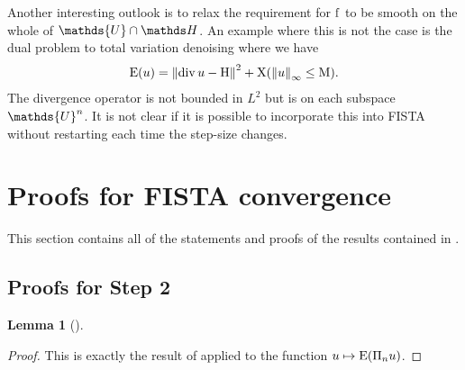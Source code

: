\documentclass[10pt,a4paper,onecolumn]{article} \usepackage[latin1]{inputenc}
\numberwithin{equation}{section}
\newtheorem{lemma}{Lemma}[section]\newtheorem{example}{Example}[section]
\let\F\mathds\let\C\mathcal\newcommand{\R}{\F{R}}\newcommand{\A}{\C{A}}
\newcommand{\norm}[1]{{\left\lVert #1 \right\rVert}}
\newcommand{\op}[1]{\operatorname{#1}}\newcommand{\overtext}[2]{\stackrel{\text{#1}}{#2}}
\newcommand*{\Func}[1]{%
	\IfEqCase{#1}{%
		{0}{\op{E}}%
		{1}{\op{F}}%
		{2}{\op{G}}%
		{3}{\op{H}}%
	}[\op{F}#1]%
}
\newcommand*{\func}[1]{%
	\IfEqCase{#1}{%
		{0}{\op{e}}%
		{1}{\op{f}}%
		{2}{\op{g}}%
		{3}{\op{h}}%
	}[\op{f}#1]%
}
\newcommand*{\varf}[1]{%
	\IfEqCase{#1}{%
		{0}{u}%
		{1}{v}%
		{2}{w}%
	}[u#1]%
}
\newcommand*{\spcf}[1]{%
	\IfEqCase{#1}{%
		{0}{\F{U}}%
		{1}{\F{V}}%
		{2}{\F{W}}%
	}[\F{U}#1]%
}
\begin{document}
Another interesting outlook is to relax the requirement for $\func1$ to be smooth on the whole of $\spcf0\cap\F H$. An example where this is not the case is the dual problem to total variation denoising where we have
$$ \Func0(\varf0) = \norm{\op{div}\varf0-\vdata0}^2 + \chi(\norm{\varf0}_\infty\leq \mu).$$
The divergence operator is not bounded in $L^2$ but is on each subspace $\spcf0^n$. It is not clear if it is possible to incorporate this into FISTA without restarting each time the step-size changes.

\newpage\appendix
\section{Proofs for FISTA convergence}\label{app:ca: FISTA convergence}
This section contains all of the statements and proofs of the results contained in .

\subsection{Proofs for Step 2}

\begin{lemma}[]\label{app:thm:ca: descent lemma}
\end{lemma}
\begin{proof}
	This is exactly the result of \cite[Lemma 1]{Chambolle2015} applied to the function $\varf0\mapsto\Func0(\Pi_n\varf0)$.
\end{proof}
\end{document}

